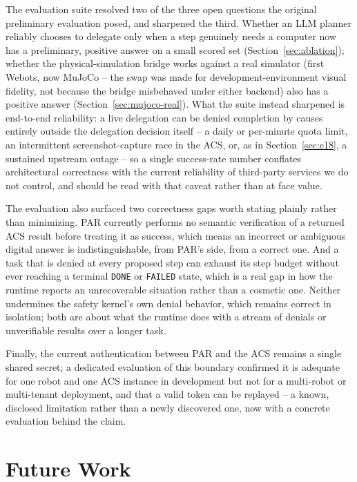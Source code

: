 \documentclass{article}
\begin{document}
The evaluation suite resolved two of the three open questions the original preliminary evaluation posed, and sharpened the third. Whether an LLM planner reliably chooses to delegate only when a step genuinely needs a computer now has a preliminary, positive answer on a small scored set (Section~\ref{sec:ablation}); whether the physical-simulation bridge works against a real simulator (first Webots, now MuJoCo -- the swap was made for development-environment visual fidelity, not because the bridge misbehaved under either backend) also has a positive answer (Section~\ref{sec:mujoco-real}). What the suite instead sharpened is end-to-end reliability: a live delegation can be denied completion by causes entirely outside the delegation decision itself -- a daily or per-minute quota limit, an intermittent screenshot-capture race in the ACS, or, as in Section~\ref{sec:e18}, a sustained upstream outage -- so a single success-rate number conflates architectural correctness with the current reliability of third-party services we do not control, and should be read with that caveat rather than at face value.

The evaluation also surfaced two correctness gaps worth stating plainly rather than minimizing. PAR currently performs no semantic verification of a returned ACS result before treating it as success, which means an incorrect or ambiguous digital answer is indistinguishable, from PAR's side, from a correct one. And a task that is denied at every proposed step can exhaust its step budget without ever reaching a terminal \texttt{DONE} or \texttt{FAILED} state, which is a real gap in how the runtime reports an unrecoverable situation rather than a cosmetic one. Neither undermines the safety kernel's own denial behavior, which remains correct in isolation; both are about what the runtime does with a stream of denials or unverifiable results over a longer task.

Finally, the current authentication between PAR and the ACS remains a single shared secret; a dedicated evaluation of this boundary confirmed it is adequate for one robot and one ACS instance in development but not for a multi-robot or multi-tenant deployment, and that a valid token can be replayed -- a known, disclosed limitation rather than a newly discovered one, now with a concrete evaluation behind the claim.


\section{Future Work}
\label{sec:future}
\end{document}
